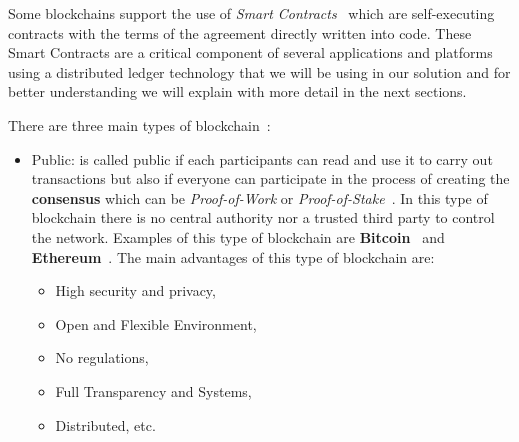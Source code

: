 Some blockchains support the use of \textit{Smart Contracts}~\cite{kaur2023introduction} which are self-executing contracts with the terms of the agreement directly written into code.
These Smart Contracts are a critical component of several applications and platforms using a distributed ledger technology that we will be using in our solution and for better understanding we will explain with
more detail in the next sections.

There are three main types of blockchain~\cite{paul2021blockchain}:

\begin{itemize}
    \item {Public}: is called public if each participants can read and use it to carry out transactions but also
          if everyone can participate in the process of creating the \textbf{consensus} which can be \textit{Proof-of-Work} or \textit{Proof-of-Stake}~\cite{whatIsConsensusCrypto, whatIsConsensus}.
          In this type of blockchain there is no central authority nor a trusted third party to control the network.
          Examples of this type of blockchain are \textbf{Bitcoin}~\cite{nakamoto2008bitcoin} and \textbf{Ethereum}~\cite{tual2015ethereum}. The main advantages of this type of blockchain are:
          \begin{itemize}
              \item High security and privacy,
              \item Open and Flexible Environment,
              \item No regulations,
              \item Full Transparency and Systems,
              \item Distributed, etc.
          \end{itemize}


\end{itemize}
